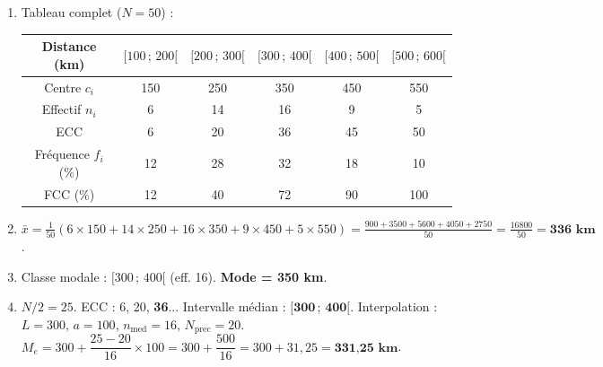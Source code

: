 \documentclass[11pt]{article}
\begin{document}
\begin{corrige}
\begin{enumerate}
\item Tableau complet ($N=50$) :
\begin{center}
\begin{tabular}{|c|ccccc|}\hline
Distance (km) & $[100\,;\,200[$ & $[200\,;\,300[$ & $[300\,;\,400[$ & $[400\,;\,500[$ & $[500\,;\,600[$ \\ \hline
Centre $c_i$ & 150 & 250 & 350 & 450 & 550 \\
Effectif $n_i$ & 6 & 14 & 16 & 9 & 5 \\
ECC & 6 & 20 & 36 & 45 & 50 \\
Fréquence $f_i$ (\%) & 12 & 28 & 32 & 18 & 10 \\
FCC (\%) & 12 & 40 & 72 & 90 & 100 \\ \hline
\end{tabular}
\end{center}
\item $\bar{x} = \frac{1}{50}(6\times150 + 14\times250 + 16\times350 + 9\times450 + 5\times550) = \frac{900+3500+5600+4050+2750}{50} = \frac{16800}{50} = \textbf{336 km}$.
\item Classe modale : $[300\,;\,400[$ (eff. 16). \textbf{Mode = 350 km}.
\item $N/2 = 25$. ECC : 6, 20, \textbf{36}... Intervalle médian : $\boldsymbol{[300\,;\,400[}$.
Interpolation : $L=300$, $a=100$, $n_{\text{med}}=16$, $N_{\text{prec}}=20$.
$M_e = 300 + \dfrac{25-20}{16}\times 100 = 300 + \dfrac{500}{16} = 300 + 31,25 = \textbf{331,25 km}$.
\end{enumerate}
\end{corrige}
\end{document}
